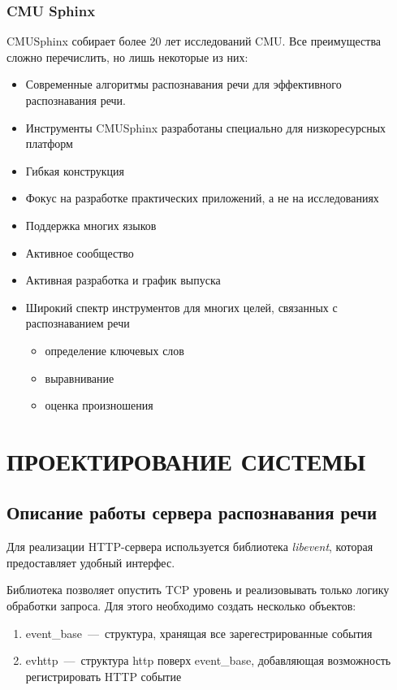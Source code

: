 \subsection{CMU Sphinx}

CMUSphinx собирает более 20 лет исследований CMU. Все преимущества сложно перечислить,
но лишь некоторые из них:
\begin{itemize}
    \item Современные алгоритмы распознавания речи для эффективного распознавания речи.
    \item Инструменты CMUSphinx разработаны специально для низкоресурсных платформ
    \item Гибкая конструкция
    \item Фокус на разработке практических приложений, а не на исследованиях
    \item Поддержка многих языков
    \item Активное сообщество
    \item Активная разработка и график выпуска
    \item Широкий спектр инструментов для многих целей, связанных с распознаванием речи
    \begin{itemize}
        \item определение ключевых слов
        \item выравнивание
        \item оценка произношения
    \end{itemize}
\end{itemize}

\chapter{ПРОЕКТИРОВАНИЕ СИСТЕМЫ}
\section{Описание работы сервера распознавания речи}
Для реализации HTTP-сервера используется библиотека \textit{libevent}, которая
предоставляет удобный интерфес.

Библиотека позволяет опустить TCP уровень и реализовывать только логику обработки
запроса. Для этого необходимо создать несколько объектов:
\begin{enumerate}
    \item event\_base~---~структура, хранящая все зарегестрированные события
    \item evhttp~---~структура http поверх event\_base, добавляющая возможность
    регистрировать HTTP событие
\end{enumerate}

